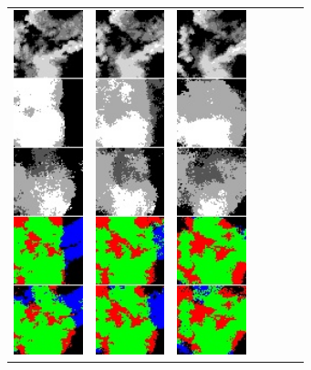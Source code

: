 \begin{figure}[h]
\begin{tabular}{lllllll}
\includegraphics[width=20mm]{abb/prediction/103_cat_maxCont}&
\includegraphics[width=20mm]{abb/prediction/104_cat_maxCont}&
\includegraphics[width=20mm]{abb/prediction/105_cat_maxCont}&

\end{tabular}
\end{figure}
